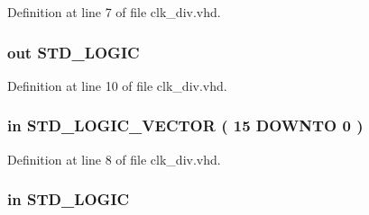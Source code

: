 Definition at line 7 of file clk\+\_\+div.\+vhd.

\hypertarget{classclk__div_a8147ca5cedee84ed9753ac6f1f0b2374}{}
\subsubsection[{clk\+\_\+out}]{ {\bfseries \textcolor{keywordflow}{out}\textcolor{vhdlchar}{ }} {\bfseries \textcolor{comment}{S\+T\+D\+\_\+\+L\+O\+G\+I\+C}\textcolor{vhdlchar}{ }} \hspace{0.3cm}{\ttfamily [Port]}}\label{classclk__div_a8147ca5cedee84ed9753ac6f1f0b2374}


Definition at line 10 of file clk\+\_\+div.\+vhd.

\hypertarget{classclk__div_a425c2042b3ea21827b9b29c6712312d9}{}
\subsubsection[{div}]{ {\bfseries \textcolor{keywordflow}{in}\textcolor{vhdlchar}{ }} {\bfseries \textcolor{comment}{S\+T\+D\+\_\+\+L\+O\+G\+I\+C\+\_\+\+V\+E\+C\+T\+O\+R}\textcolor{vhdlchar}{ }\textcolor{vhdlchar}{(}\textcolor{vhdlchar}{ }\textcolor{vhdlchar}{ } \textcolor{vhdldigit}{15} \textcolor{vhdlchar}{ }\textcolor{keywordflow}{D\+O\+W\+N\+T\+O}\textcolor{vhdlchar}{ }\textcolor{vhdlchar}{ } \textcolor{vhdldigit}{0} \textcolor{vhdlchar}{ }\textcolor{vhdlchar}{)}\textcolor{vhdlchar}{ }} \hspace{0.3cm}{\ttfamily [Port]}}\label{classclk__div_a425c2042b3ea21827b9b29c6712312d9}


Definition at line 8 of file clk\+\_\+div.\+vhd.

\hypertarget{classclk__div_a512588aa484615b7e90600a1bc9507b4}{}
\subsubsection[{en}]{ {\bfseries \textcolor{keywordflow}{in}\textcolor{vhdlchar}{ }} {\bfseries \textcolor{comment}{S\+T\+D\+\_\+\+L\+O\+G\+I\+C}\textcolor{vhdlchar}{ }} \hspace{0.3cm}{\ttfamily [Port]}}\label{classclk__div_a512588aa484615b7e90600a1bc9507b4}


